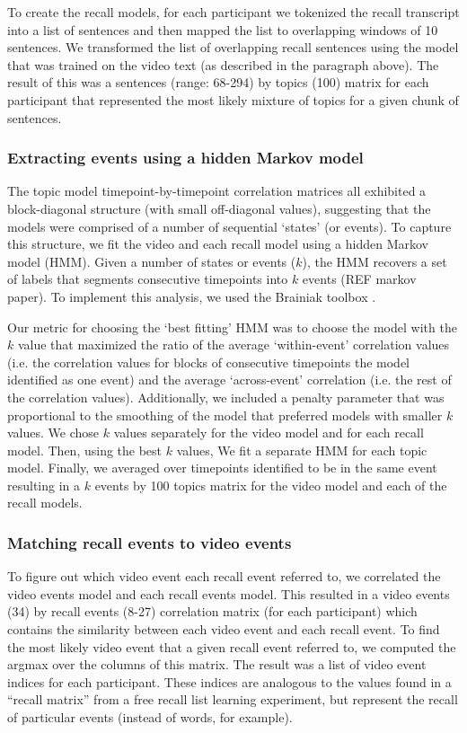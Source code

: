 \documentclass{article}
\begin{document}
{To create the recall models, for each participant we tokenized the recall transcript into a list of sentences and then mapped the list to overlapping windows of 10 sentences.  We transformed the list of overlapping recall sentences using the model that was trained on the video text (as described in the paragraph above). The result of this was a sentences (range: 68-294) by topics (100) matrix for each participant that represented the most likely mixture of topics for a given chunk of sentences.

\subsubsection{Extracting events using a hidden Markov model}
The topic model timepoint-by-timepoint correlation matrices all exhibited a block-diagonal structure (with small off-diagonal values), suggesting that the models were comprised of a number of sequential `states' (or events). To capture this structure, we fit the video and each recall model using a hidden Markov model (HMM). Given a number of states or events ($k$), the HMM recovers a set of labels that segments consecutive timepoints into $k$ events (REF markov paper). To implement this analysis, we used the Brainiak toolbox \citep{BaldEtal17}.

Our metric for choosing the `best fitting' HMM was to choose the model with the $k$ value that maximized the ratio of the average `within-event' correlation values (i.e. the correlation values for blocks of consecutive timepoints the model identified as one event) and the average `across-event' correlation (i.e. the rest of the correlation values). Additionally, we included a penalty parameter that was proportional to the smoothing of the model that preferred models with smaller $k$ values. We chose $k$ values separately for the video model and for each recall model.  Then, using the best $k$ values, We fit a separate HMM for each topic model. Finally, we averaged over timepoints identified to be in the same event resulting in a $k$ events by 100 topics matrix for the video model and each of the recall models.
%
\subsubsection{Matching recall events to video events}
To figure out which video event each recall event referred to, we correlated the video events model and each recall events model. This resulted in a video events (34) by recall events (8-27) correlation matrix (for each participant) which contains the similarity between each video event and each recall event.  To find the most likely video event that a given recall event referred to, we computed the argmax over the columns of this matrix.  The result was a list of video event indices for each participant. These indices are analogous to the values found in a ``recall matrix'' from a free recall list learning experiment, but represent the recall of particular events (instead of words, for example).
%
}
\end{document}

